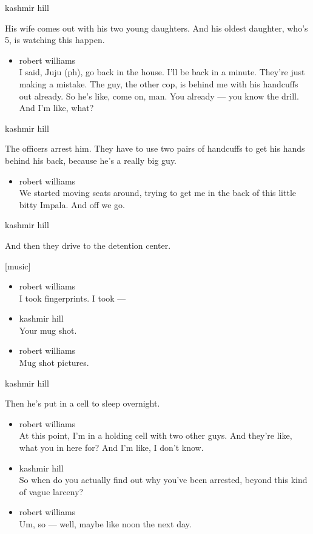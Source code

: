 kashmir hill

His wife comes out with his two young daughters. And his oldest
daughter, who's 5, is watching this happen.

\begin{itemize}
\tightlist
\item
  robert williams\\
  I said, Juju (ph), go back in the house. I'll be back in a minute.
  They're just making a mistake. The guy, the other cop, is behind me
  with his handcuffs out already. So he's like, come on, man. You
  already --- you know the drill. And I'm like, what?
\end{itemize}

kashmir hill

The officers arrest him. They have to use two pairs of handcuffs to get
his hands behind his back, because he's a really big guy.

\begin{itemize}
\tightlist
\item
  robert williams\\
  We started moving seats around, trying to get me in the back of this
  little bitty Impala. And off we go.
\end{itemize}

kashmir hill

And then they drive to the detention center.

{[}music{]}

\begin{itemize}
\item
  robert williams\\
  I took fingerprints. I took ---
\item
  kashmir hill\\
  Your mug shot.
\item
  robert williams\\
  Mug shot pictures.
\end{itemize}

kashmir hill

Then he's put in a cell to sleep overnight.

\begin{itemize}
\item
  robert williams\\
  At this point, I'm in a holding cell with two other guys. And they're
  like, what you in here for? And I'm like, I don't know.
\item
  kashmir hill\\
  So when do you actually find out why you've been arrested, beyond this
  kind of vague larceny?
\item
  robert williams\\
  Um, so --- well, maybe like noon the next day.
\end{itemize}

